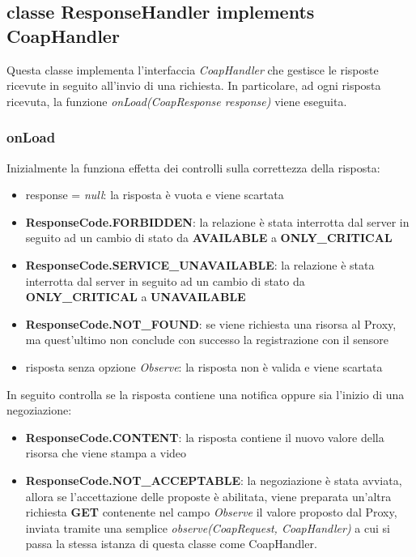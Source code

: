 		\subsection{classe ResponseHandler implements CoapHandler}
			Questa classe implementa l'interfaccia \textit{CoapHandler} che gestisce le risposte ricevute in seguito all'invio di una richiesta. In particolare, ad ogni risposta ricevuta, la funzione \textit{onLoad(CoapResponse response)} viene eseguita.
			\subsubsection{onLoad}
				Inizialmente la funziona effetta dei controlli sulla correttezza della risposta:
				\begin{itemize}
					\item response = \textit{null}: la risposta è vuota e viene scartata
					\item \textbf{ResponseCode.FORBIDDEN}: la relazione è stata interrotta dal server in seguito ad un cambio di stato da \textbf{AVAILABLE} a \textbf{ONLY\_CRITICAL}
					\item \textbf{ResponseCode.SERVICE\_UNAVAILABLE}: la relazione è stata interrotta dal server in seguito ad un cambio di stato da 						\textbf{ONLY\_CRITICAL} a \textbf{UNAVAILABLE}
					\item \textbf{ResponseCode.NOT\_FOUND}: se viene richiesta una risorsa al Proxy, ma quest'ultimo non conclude con successo la registrazione con il sensore
					\item risposta senza opzione \textit{Observe}: la risposta non è valida e viene scartata
				\end{itemize}
				In seguito controlla se la risposta contiene una notifica oppure sia l'inizio di una negoziazione:
				\begin{itemize}
					\item \textbf{ResponseCode.CONTENT}: la risposta contiene il nuovo valore della risorsa che viene stampa a video
					\item \textbf{ResponseCode.NOT\_ACCEPTABLE}: la negoziazione è stata avviata, allora se l'accettazione delle proposte è abilitata, viene preparata un'altra richiesta \textbf{GET} contenente nel campo \textit{Observe} il valore proposto dal Proxy, inviata tramite una semplice \textit{observe(CoapRequest, CoapHandler)} a cui si passa la stessa istanza di questa classe come CoapHandler.
				\end{itemize}
